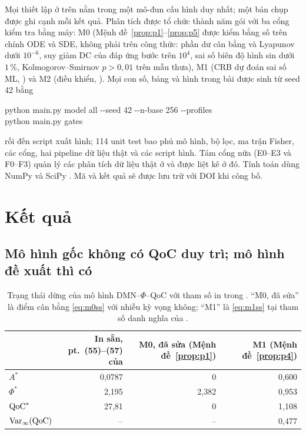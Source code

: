 Mọi thiết lập ở trên nằm trong một mô-đun cấu hình duy nhất; một bản chụp được ghi cạnh mỗi kết quả. Phân tích được tổ chức thành năm gói với ba cổng kiểm tra bằng máy: M0 (Mệnh đề~\ref{prop:p1}--\ref{prop:p5} được kiểm bằng số trên chính ODE và SDE, không phải trên công thức: phần dư cân bằng và Lyapunov dưới $10^{-6}$, suy giảm DC của đáp ứng bước trên $10^{4}$, sai số biên độ hình sin dưới $1\,\%$, Kolmogorov--Smirnov $p>0{,}01$ trên mẫu thưa), M1 (CRB dự đoán sai số ML, ) và M2 (điều khiển, ). Mọi con số, bảng và hình trong bài được sinh từ seed 42 bằng
\begin{center}\small\ttfamily
python main.py model all -{}-seed 42 -{}-n-base 256 -{}-profiles\\
python main.py gates
\end{center}
rồi đến script xuất hình; 114 unit test bao phủ mô hình, bộ lọc, ma trận Fisher, các cổng, hai pipeline dữ liệu thật và các script hình. Tám cổng nữa (E0--E3 và F0--F3) quản lý các phân tích dữ liệu thật ở  và được liệt kê ở đó. Tính toán dùng NumPy và SciPy \citep{Harris2020,Virtanen2020}. Mã và kết quả sẽ được lưu trữ với DOI khi công bố.

\section{Kết quả}
\label{sec:results}

\subsection{Mô hình gốc không có QoC duy trì; mô hình đề xuất thì có}
\label{sec:res-m0}

\begin{table}[t]
\centering\small
\caption{Trạng thái dừng của mô hình DMN--$\Phi$--QoC với tham số in trong \citet{BQI}. ``M0, đã sửa'' là điểm cân bằng \eqref{eq:m0ss} với nhiễu kỳ vọng không; ``M1'' là \eqref{eq:m1ss} tại tham số danh nghĩa của .}
\label{tab:steady}
\setlength{\tabcolsep}{4pt}
\begin{tabular}{lrrr}
\toprule
 & In sẵn, pt.~(55)--(57) của \citep{BQI} & M0, đã sửa (Mệnh đề~\ref{prop:p1}) & M1 (Mệnh đề~\ref{prop:p4}) \\
\midrule
$A^*$            & 0,0787  & 0      & 0,600 \\
$\Phi^*$         & 2,195   & 2,382  & 0,953 \\
$\mathrm{QoC}^*$         & 27,81   & 0      & 1,108 \\
$\operatorname{Var}_\infty(\mathrm{QoC})$ & --   & --     & 0,477 \\
\bottomrule
\end{tabular}
\end{table}

